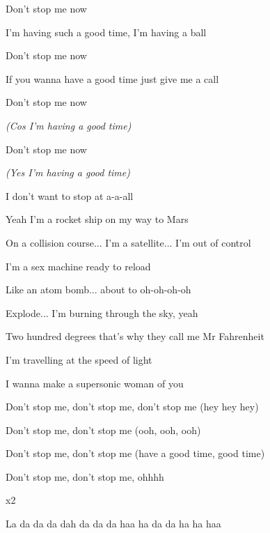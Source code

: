 \begin{song}
\begin{chorusbox}
\bigskip

Don’t stop me now \par
I’m having such a good time, I’m having a ball \par
{}Don’t stop me now \par
If you wanna have a good time just give me a call \par
{}Don’t stop me now \par
\hspace{120pt} \textit{(Cos I’m having a good time)} \par
{}Don’t stop me now \par
\hspace{120pt} \textit{(Yes I’m having a good time)} \par
I don’t want to stop at a-a-all
\end{chorusbox}

\bigskip

Yeah I’m a rocket ship on my way to Mars \par
On a collision course... I’m a satellite... I’m out of control \par
I’m a sex machine ready to reload \par
Like an atom bomb... about to oh-oh-oh-oh \par

\bigskip

Explode... I’m burning through the sky, yeah \par
Two hundred degrees that’s why they call me Mr Fahrenheit \par
I’m travelling at the speed of light \par
I wanna make a supersonic woman of you \par

\bigskip

 Don’t stop me, don’t stop me, don’t stop me (hey hey hey) \par
Don’t stop me, don’t stop me (ooh, ooh, ooh) \par
Don’t stop me, don’t stop me (have a good time, good time) \par
Don’t stop me, don’t stop me, ohhhh \par
{}     x2 \par

\bigskip

 \par

\bigskip

 La da da da dah da da da haa ha da da ha ha haa  \par

\end{song}
